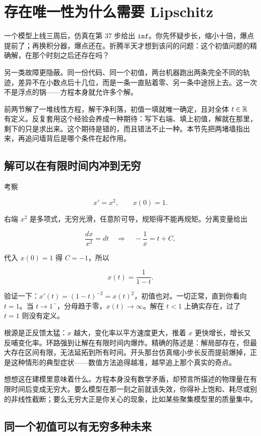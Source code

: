\section{存在唯一性为什么需要 Lipschitz}
\label{sec:15-Differential-Equations-and-Dynamical-Systems/01-ODE-Theory/03}

一个模型上线三周后，仿真在第 \(37\) 步给出 \(\texttt{inf}\)。你先怀疑步长，缩小十倍，爆点提前了；再换积分器，爆点还在。折腾半天才想到该问的问题：这个初值问题的精确解，在那个时刻之后还存在吗？

另一类故障更隐蔽。同一份代码、同一个初值，两台机器跑出两条完全不同的轨迹，差异不在小数点后十几位，而是一条一直贴着零、另一条中途拐上去。这一次不是浮点的锅——方程本身就允许多个解。

前两节解了一堆线性方程，解干净利落，初值一填就唯一确定，且对全体 \(t\in\mathbb{R}\) 有定义。反复套用这个经验会养成一种期待：写下右端、填上初值，解就在那里，剩下的只是求出来。这个期待是错的，而且错法不止一种。本节先把两堵墙指出来，再追问墙背后是哪个条件在起作用。

\subsection{解可以在有限时间内冲到无穷}

考察

\[
x'=x^2,\qquad x(0)=1.
\]

右端 \(x^2\) 是多项式，无穷光滑，任意阶可导，规矩得不能再规矩。分离变量给出

\[
\frac{dx}{x^2}=dt
\quad\Longrightarrow\quad
-\frac{1}{x}=t+C,
\]

代入 \(x(0)=1\) 得 \(C=-1\)，所以

\[
x(t)=\frac{1}{1-t}.
\]

验证一下：\(x'(t)=(1-t)^{-2}=x(t)^2\)，初值也对。一切正常，直到你看向 \(t=1\)。当 \(t\to1^{-}\)，分母趋于零，\(x(t)\to\infty\)。解在 \(t<1\) 上确实存在，过了 \(t=1\) 则没有定义。

根源是正反馈太猛：\(x\) 越大，变化率以平方速度更大，推着 \(x\) 更快增长，增长又反哺变化率。环路强到让解在有限时间内爆炸。精确的陈述是：解局部存在，但最大存在区间有限，无法延拓到所有时间。开头那台仿真缩小步长反而提前爆掉，正是这种情形的典型症状——数值方法追得越准，越早追上那个真实的奇点。

想想这在建模里意味着什么。方程本身没有数学矛盾，却预言所描述的物理量在有限时间后变成无穷大。要么模型在那一刻之前就该失效，你得补上饱和、耗尽或别的非线性截断；要么无穷大正是你关心的现象，比如某些聚集模型里的质量集中。

\subsection{同一个初值可以有无穷多种未来}

